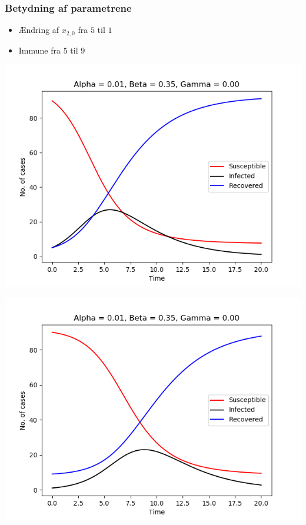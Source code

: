%
\begin{frame}
\frametitle{Betydning af parametrene}
\begin{itemize}
\item Ændring af $x_{2,0}$ fra $5$ til $1$
\item Immune fra $5$ til $9$
\end{itemize}

\begin{minipage}{0.49\textwidth}
\includegraphics[scale=0.3]{fig/img/t_a1_b35_g0.png}
\end{minipage}
%
\begin{minipage}{0.49\textwidth}
\includegraphics[scale=0.3]{fig/img/t_x1_1_x2_90.png}
\end{minipage}
\end{frame}
